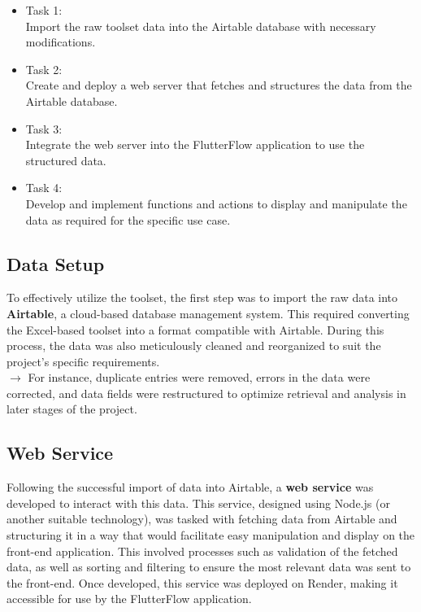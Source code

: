 \begin{itemize}
    \item Task 1: \\
          Import the raw  toolset data into the Airtable database with necessary modifications.
    \item Task 2: \\
          Create and deploy a web server that fetches and structures the data from the Airtable database.
    \item Task 3: \\
          Integrate the web server into the FlutterFlow application to use the structured data.
    \item Task 4: \\
          Develop and implement functions and actions to display and manipulate the data as required for the specific use case.
\end{itemize}


\subsection{Data Setup}

To effectively utilize the  toolset, the first step was to import the raw data into {\color{limeGreen}\textbf{Airtable}}, a cloud-based database management system. 
This required converting the Excel-based  toolset into a format compatible with Airtable. 
During this process, the data was also meticulously cleaned and reorganized to suit the project's specific requirements. \\
$ \rightarrow $ \quad For instance, duplicate entries were removed, errors in the data were corrected, and data fields were restructured to optimize retrieval and analysis in later stages of the project.

\subsection{Web Service}

Following the successful import of data into Airtable, a {\color{limeGreen}\textbf{web service}} was developed to interact with this data. 
This service, designed using Node.js (or another suitable technology), was tasked with fetching data from Airtable and structuring it in a way that would facilitate easy manipulation and display on the front-end application. 
This involved processes such as validation of the fetched data, as well as sorting and filtering to ensure the most relevant data was sent to the front-end. 
Once developed, this service was deployed on Render, making it accessible for use by the FlutterFlow application.


